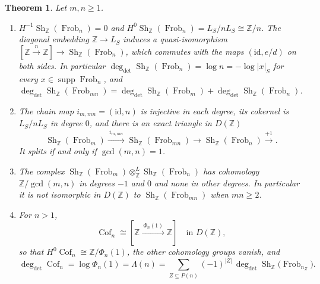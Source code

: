\documentclass[11pt]{amsart}
\newtheorem{theorem}{Theorem}[section]
\theoremstyle{definition}
\newcommand{\Z}{\mathbb Z}
\newcommand{\Frob}{\operatorname{Frob}}
\newcommand{\Sh}{\operatorname{Sh}}
\newcommand{\Prim}{\operatorname{Cof}}
\newcommand{\supp}{\operatorname{supp}}
\newcommand{\degdet}{\operatorname{deg}_{\mathrm{det}}}
\begin{document}
\begin{theorem}\label{thm:shstructure}
Let $m,n\ge1$.
\begin{enumerate}
\item[(i)] $H^{-1}\Sh_\Z(\Frob_n)=0$ and
$H^0\Sh_\Z(\Frob_n)=L_S/nL_S\cong\Z/n$.  The diagonal embedding $\Z\to L_S$
induces a quasi-isomorphism
$[\Z\xrightarrow{n}\Z]\to\Sh_\Z(\Frob_n)$, which commutes with the maps
$(\mathrm{id},e/d)$ on both sides.  In particular
$\degdet\Sh_\Z(\Frob_n)=\log n=-\log|x|_S$ for every $x\in\supp\Frob_n$, and
$\degdet\Sh_\Z(\Frob_{mn})=\degdet\Sh_\Z(\Frob_m)+\degdet\Sh_\Z(\Frob_n)$.
\item[(ii)] The chain map $i_{m,mn}=(\mathrm{id},n)$ is injective in each
degree, its cokernel is $L_S/nL_S$ in degree $0$, and there is an exact
triangle in $D(\Z)$
\begin{equation}\label{eq:triangle}
  \Sh_\Z(\Frob_m)\xrightarrow{\ i_{m,mn}\ }\Sh_\Z(\Frob_{mn})
   \longrightarrow\Sh_\Z(\Frob_n)\xrightarrow{+1}.
\end{equation}
It splits if and only if $\gcd(m,n)=1$.
\item[(iii)] The complex $\Sh_\Z(\Frob_m)\otimes^L_\Z\Sh_\Z(\Frob_n)$ has
cohomology $\Z/\gcd(m,n)$ in degrees $-1$ and $0$ and none in other degrees.
In particular it is not isomorphic in $D(\Z)$ to $\Sh_\Z(\Frob_{mn})$ when
$mn\ge2$.
\item[(iv)] For $n>1$,
\[
  \Prim_n\cong[\Z\xrightarrow{\ \Phi_n(1)\ }\Z]\quad\text{in } D(\Z),
\]
so that $H^0\Prim_n\cong\Z/\Phi_n(1)$, the other cohomology groups vanish, and
\begin{equation}\label{eq:degreelaw}
  \degdet\Prim_n=\log\Phi_n(1)=\Lambda(n)
   =\sum_{Z\subseteq P(n)}(-1)^{|Z|}\,
     \degdet\Sh_\Z\bigl(\Frob_{n_Z}\bigr).
\end{equation}
\end{enumerate}
\end{theorem}
\end{document}

